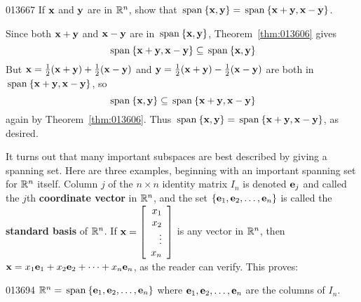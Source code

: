 \begin{example}{}{013667}
If $\textbf{x}$ and $\textbf{y}$ are in $\mathbb{R}^n$, show that $\thinspace\operatorname{span\medspace}\{\textbf{x}, \textbf{y}\} = \thinspace\operatorname{span\medspace}\{\textbf{x} + \textbf{y}, \textbf{x} - \textbf{y}\}$.

\begin{solution}
Since both $\textbf{x} + \textbf{y}$ and $\textbf{x} - \textbf{y}$ are in $\thinspace\operatorname{span\medspace}\{\textbf{x}, \textbf{y}\}$, Theorem~\ref{thm:013606} gives
\begin{equation*}
\thinspace\operatorname{span\medspace}\{\textbf{x} + \textbf{y}, \textbf{x} - \textbf{y} \} \subseteq \thinspace\operatorname{span\medspace}\{\textbf{x}, \textbf{y}\}
\end{equation*}
But $\textbf{x} = \tfrac{1}{2}(\textbf{x} + \textbf{y}) + \tfrac{1}{2}(\textbf{x} - \textbf{y})$ and $\textbf{y} = \tfrac{1}{2}(\textbf{x} + \textbf{y}) - \tfrac{1}{2}(\textbf{x} - \textbf{y})$ are both in $\thinspace\operatorname{span\medspace}\{\textbf{x} + \textbf{y}, \textbf{x} - \textbf{y}\}$, so
\begin{equation*}
\thinspace\operatorname{span\medspace}\{\textbf{x}, \textbf{y}\} \subseteq \thinspace\operatorname{span\medspace}\{\textbf{x} + \textbf{y}, \textbf{x} - \textbf{y} \}
\end{equation*}
again by Theorem~\ref{thm:013606}. Thus $\thinspace\operatorname{span\medspace}\{\textbf{x}, \textbf{y}\} = \thinspace\operatorname{span\medspace}\{\textbf{x} + \textbf{y}, \textbf{x} - \textbf{y}\}$, as desired.
\end{solution}
\end{example}

It turns out that many important subspaces are best described by giving a spanning set. Here are three examples, beginning with an important spanning set for $\mathbb{R}^n$ itself. Column $j$ of the $n \times n$ identity matrix $I_{n}$ is denoted $\textbf{e}_{j}$ and called the $j$th \textbf{coordinate vector} in $\mathbb{R}^n$, and the set $\{\textbf{e}_{1}, \textbf{e}_{2}, \dots, \textbf{e}_{n}\}$ is called the \textbf{standard basis} of $\mathbb{R}^n$. If 
$ \textbf{x} = 
	\left[ \begin{array}{r}
	x_1 \\
	x_2 \\
	\vdots \\
	x_n
	\end{array} \right] $
 is any vector in $\mathbb{R}^n$, then $\textbf{x} = x_{1}\textbf{e}_{1} + x_{2}\textbf{e}_{2} + \dots + x_{n}\textbf{e}_{n}$, as the reader can verify. This proves:

\begin{example}{}{013694}
$\mathbb{R}^n = \thinspace\operatorname{span\medspace}\{\textbf{e}_{1}, \textbf{e}_{2}, \dots, \textbf{e}_{n}\}$ where $\textbf{e}_{1}, \textbf{e}_{2}, \dots, \textbf{e}_{n}$ are the columns of $I_{n}$.
\end{example}

